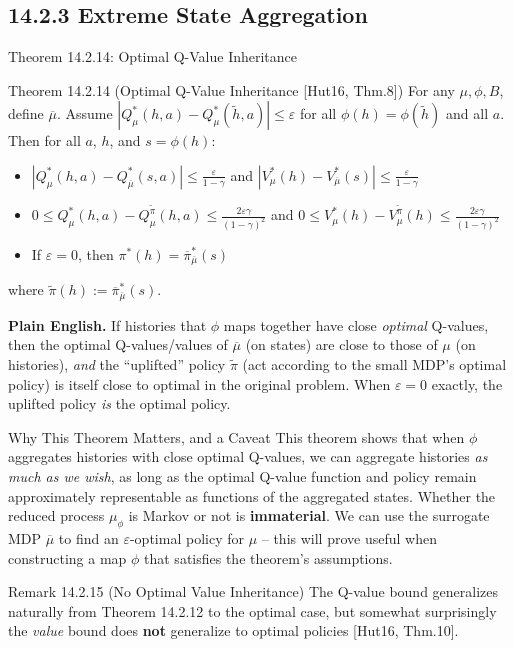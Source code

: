 \documentclass[aspectratio=169,10pt]{beamer}
\begin{document}
\subsection{14.2.3 Extreme State Aggregation}

\begin{frame}{Theorem 14.2.14: Optimal Q-Value Inheritance}
  \begin{block}{Theorem 14.2.14 (Optimal Q-Value Inheritance [Hut16, Thm.8])}
    For any $\mu,\phi,B$, define $\overline\mu$. Assume
    $|Q_\mu^*(h,a)-Q_\mu^*(\tilde h,a)|\le\varepsilon$ for all
    $\phi(h)=\phi(\tilde h)$ and all $a$. Then for all $a$, $h$, and
    $s=\phi(h)$:
    \begin{itemize}
      \item $|Q_\mu^*(h,a)-Q_{\overline\mu}^*(s,a)|\le\frac{\varepsilon}{1-\gamma}$
        and $|V_\mu^*(h)-V_{\overline\mu}^*(s)|\le\frac{\varepsilon}{1-\gamma}$
      \item $0\le Q_\mu^*(h,a)-Q_\mu^{\tilde\pi}(h,a)\le\frac{2\varepsilon\gamma}{(1-\gamma)^2}$
        and $0\le V_\mu^*(h)-V_\mu^{\tilde\pi}(h)\le\frac{2\varepsilon\gamma}{(1-\gamma)^2}$
      \item If $\varepsilon=0$, then $\pi^*(h)=\overline\pi^*_{\overline\mu}(s)$
    \end{itemize}
    where $\tilde\pi(h):=\overline\pi^*_{\overline\mu}(s)$.
  \end{block}
  \textbf{Plain English.} If histories that $\phi$ maps together have
  close \emph{optimal} Q-values, then the optimal Q-values/values of
  $\overline\mu$ (on states) are close to those of $\mu$ (on histories),
  \emph{and} the ``uplifted'' policy $\tilde\pi$ (act according to the
  small MDP's optimal policy) is itself close to optimal in the original
  problem. When $\varepsilon=0$ exactly, the uplifted policy \emph{is} the
  optimal policy.
\end{frame}

\begin{frame}{Why This Theorem Matters, and a Caveat}
  This theorem shows that when $\phi$ aggregates histories with close
  optimal Q-values, we can aggregate histories \emph{as much as we wish},
  as long as the optimal Q-value function and policy remain approximately
  representable as functions of the aggregated states. Whether the reduced
  process $\mu_\phi$ is Markov or not is \textbf{immaterial}. We can use
  the surrogate MDP $\overline\mu$ to find an $\varepsilon$-optimal policy
  for $\mu$ -- this will prove useful when constructing a map $\phi$ that
  satisfies the theorem's assumptions.

  \begin{block}{Remark 14.2.15 (No Optimal Value Inheritance)}
    The Q-value bound generalizes naturally from Theorem 14.2.12 to the
    optimal case, but somewhat surprisingly the \emph{value} bound does
    \textbf{not} generalize to optimal policies [Hut16, Thm.10].
  \end{block}
\end{frame}
\end{document}
